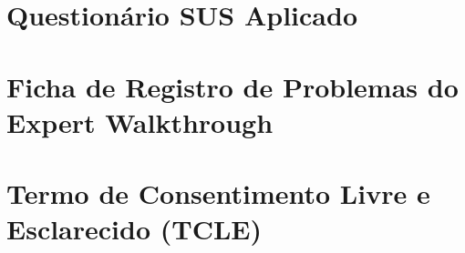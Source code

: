 \documentclass[
  12pt,
  openright,
  twoside,
  a4paper,
  english,
  brazil
]{abntex2}
\begin{document}
\begin{apendicesenv}
  \partapendices

  \chapter{Questionário SUS Aplicado}
  \label{ap:sus}

  \chapter{Ficha de Registro de Problemas do Expert Walkthrough}
  \label{ap:ficha}

  \chapter{Termo de Consentimento Livre e Esclarecido (TCLE)}
  \label{ap:tcle}

\end{apendicesenv}
\end{document}
